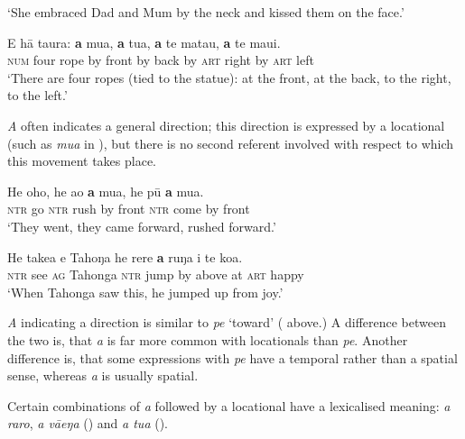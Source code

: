 \glt 
‘She embraced Dad and Mum by the neck and kissed them on the face.’ \textstyleExampleref{[R210.012]} 
\z

\ea\label{ex:4.281}
\gll E hā taura: \textbf{a} mu{\ꞌ}a, \textbf{a} tu{\ꞌ}a, \textbf{a} te mata{\ꞌ}u, \textbf{a} te maui.\\
\textsc{num} four rope by front by back by \textsc{art} right by \textsc{art} left\\

\glt 
‘There are four ropes (tied to the statue): at the front, at the back, to the right, to the left.’ \textstyleExampleref{[Ley-5-29.010–011]}
\z

\textit{A} often indicates a general direction; this direction is expressed by a locational (such as \textit{mu{\ꞌ}a} in ), but there is no second referent involved with respect to which this movement takes place. 

\ea\label{ex:4.282}
\gll He oho, he ao \textbf{a} mu{\ꞌ}a, he pū \textbf{a} mu{\ꞌ}a. \\
\textsc{ntr} go \textsc{ntr} rush by front \textsc{ntr} come by front \\

\glt 
‘They went, they came forward, rushed forward.’ \textstyleExampleref{[Ley-4-05.012]}
\z

\ea\label{ex:4.283}
\gll He take{\ꞌ}a e Tahoŋa he rere \textbf{a} ruŋa {\ꞌ}i te koa. \\
\textsc{ntr} see \textsc{ag} Tahonga \textsc{ntr} jump by above at \textsc{art} happy \\

\glt
‘When Tahonga saw this, he jumped up from joy.’ \textstyleExampleref{[R301.210]} 
\z

\textit{A} indicating a direction is similar to \textit{pe} ‘toward’ ( above.)\textstyleExampleref{} A difference between the two is, that \textit{a} is far more common with locationals than \textit{pe}. Another difference is, that some expressions with \textit{pe} have a temporal rather than a spatial sense, whereas \textit{a} is usually spatial.

Certain combinations of \textit{a} followed by a locational have a lexicalised meaning: \textit{a raro}, \textit{a vāeŋa} () and \textit{a tu{\ꞌ}a} ().
